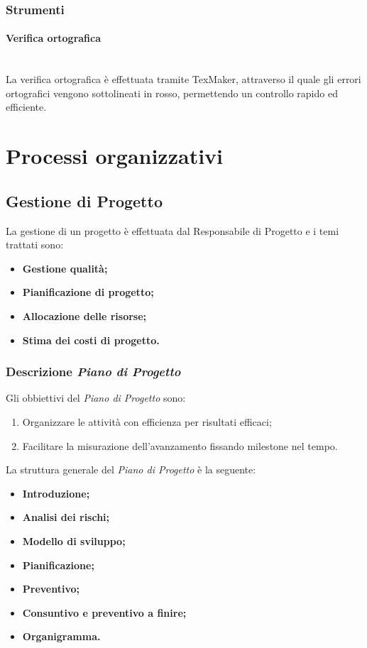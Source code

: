 \documentclass[11pt,a4paper]{article}
\begin{document}
\subsubsection{Strumenti}
\paragraph{Verifica ortografica}
\noindent \\
La verifica ortografica è effettuata tramite TexMaker, attraverso il quale gli errori ortografici vengono sottolineati in rosso, permettendo un controllo rapido ed efficiente.


\newpage
\section{Processi organizzativi}

\subsection{Gestione di Progetto}
La gestione di un progetto è effettuata dal Responsabile di Progetto e i temi trattati sono:
\begin{itemize}
\item \textbf{Gestione qualità;}
\item \textbf{Pianificazione di progetto;}
\item \textbf{Allocazione delle risorse;}
\item \textbf{Stima dei costi di progetto.}
\end{itemize}

\subsubsection{Descrizione \textit{Piano di Progetto}}

Gli obbiettivi del \textit{Piano di Progetto} sono:

\begin{enumerate}
\item Organizzare le attività con efficienza per risultati efficaci;
\item Facilitare la misurazione dell'avanzamento fissando milestone nel tempo.
\end{enumerate}

La struttura generale del \textit{Piano di Progetto} è la seguente:
\begin{itemize}
\item \textbf{Introduzione;}
\item \textbf{Analisi dei rischi;}
\item \textbf{Modello di sviluppo;}
\item \textbf{Pianificazione;}
\item \textbf{Preventivo;}
\item \textbf{Consuntivo e preventivo a finire;}
\item \textbf{Organigramma.}
\end{itemize}
\end{document}
